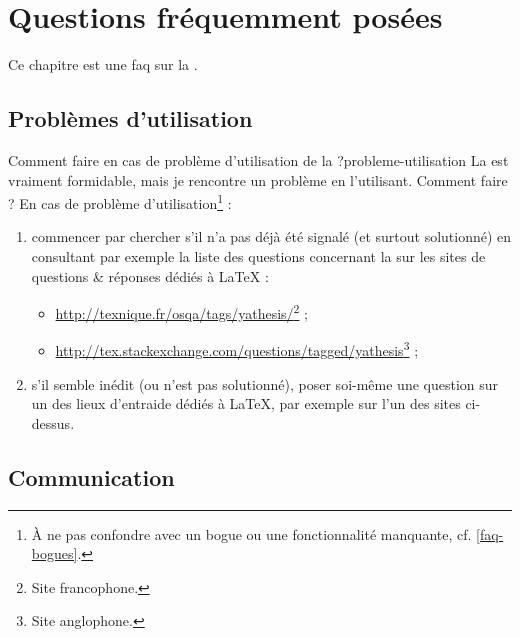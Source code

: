 \chapter{Questions fréquemment posées}\label{cha-faq}

Ce chapitre est une \gls{faq}  sur la \yatCl{}.

\section{Problèmes d'utilisation}

\begin{dbfaq}{Comment faire en cas de problème d'utilisation de la \yatCl{} ?}{probleme-utilisation}
  La \yatCl{} est vraiment formidable, mais je rencontre un problème en
  l'utilisant.  Comment faire ?
  \tcblower
  En cas de problème d'utilisation\footnote{À ne pas confondre avec un
    bogue ou une fonctionnalité manquante, cf. \vref{faq-bogues}.} :
  \begin{enumerate}
  \item commencer par chercher s'il n'a pas déjà été signalé
    (et surtout solutionné) en consultant par exemple la liste des questions
    concernant la \yatCl{} sur les sites de questions \& réponses dédiés
    à \LaTeX{} :
      \begin{itemize}
      \item \url{http://texnique.fr/osqa/tags/yathesis/}\footnote{Site francophone.} ;
      \item
        \url{http://tex.stackexchange.com/questions/tagged/yathesis}\footnote{Site anglophone.} ;
      \end{itemize}
    \item s'il semble inédit (ou n'est pas  solutionné), poser
      soi-même une question sur un des lieux d'entraide dédiés à \LaTeX{}, par
      exemple sur l'un des sites ci-dessus\ecm{}.
    \end{enumerate}
\end{dbfaq}

\section{Communication}
\label{sec-communication}

